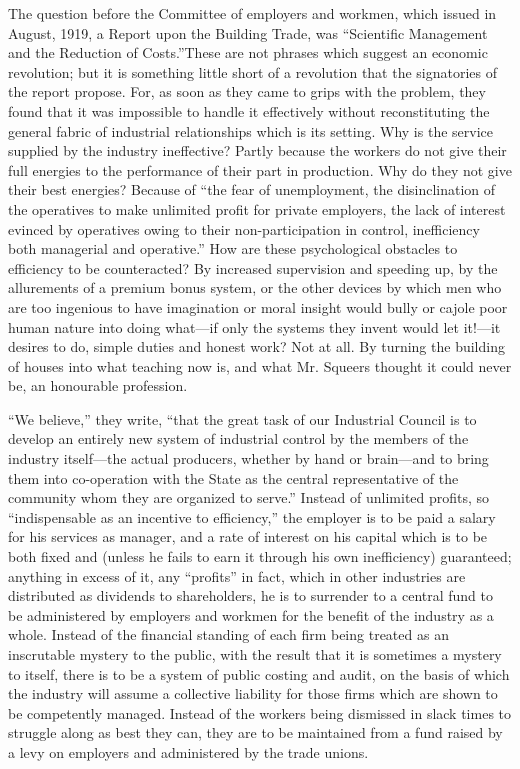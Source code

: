 \documentclass{book}
\begin{document}
The question before the Committee of employers and workmen, which issued in August, 1919, a Report upon the Building Trade, was “Scientific Management and the Reduction of Costs.”\footnotemark[1] These are not phrases which suggest an economic revolution; but it is something little short of a revolution that the signatories of the report propose. For, as soon as they came to grips with the problem, they found that it was impossible to handle it effectively without reconstituting the general fabric of industrial relationships which is its setting. Why is the service supplied by the industry ineffective? Partly because the workers do not give their full energies to the performance of their part in production. Why do they not give their best energies? Because of “the fear of unemployment, the disinclination of the operatives to make unlimited profit for private employers, the lack of interest evinced by operatives owing to their non-participation in control, inefficiency both managerial and operative.” How are these psychological obstacles to efficiency to be counteracted? By increased supervision and speeding up, by the allurements of a premium bonus system, or the other devices by which men who are too ingenious to have imagination or moral insight would bully or cajole poor human nature into doing what—if only the systems they invent would let it!—it desires to do, simple duties and honest work? Not at all. By turning the building of houses into what teaching now is, and what Mr. Squeers thought it could never be, an honourable profession.

“We believe,” they write, “that the great task of our Industrial Council is to develop an entirely new system of industrial control by the members of the industry itself—the actual producers, whether by hand or brain—and to bring them into co-operation with the State as the central representative of the community whom they are organized to serve.” Instead of unlimited profits, so “indispensable as an incentive to efficiency,” the employer is to be paid a salary for his services as manager, and a rate of interest on his capital which is to be both fixed and (unless he fails to earn it through his own inefficiency) guaranteed; anything in excess of it, any “profits” in fact, which in other industries are distributed as dividends to shareholders, he is to surrender to a central fund to be administered by employers and workmen for the benefit of the industry as a whole. Instead of the financial standing of each firm being treated as an inscrutable mystery to the public, with the result that it is sometimes a mystery to itself, there is to be a system of public costing and audit, on the basis of which the industry will assume a collective liability for those firms which are shown to be competently managed. Instead of the workers being dismissed in slack times to struggle along as best they can, they are to be maintained from a fund raised by a levy on employers and administered by the trade unions.
\end{document}
